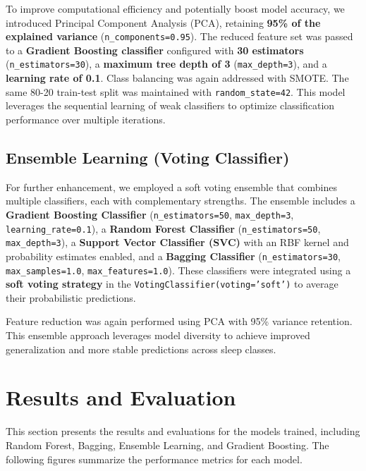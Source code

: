 To improve computational efficiency and potentially boost model accuracy, we introduced Principal Component Analysis (PCA), retaining \textbf{95\% of the explained variance} (\texttt{n\_components=0.95}). The reduced feature set was passed to a \textbf{Gradient Boosting classifier} configured with \textbf{30 estimators} (\texttt{n\_estimators=30}), a \textbf{maximum tree depth of 3} (\texttt{max\_depth=3}), and a \textbf{learning rate of 0.1}. Class balancing was again addressed with SMOTE. The same 80-20 train-test split was maintained with \texttt{random\_state=42}. This model leverages the sequential learning of weak classifiers to optimize classification performance over multiple iterations.

\subsection{Ensemble Learning (Voting Classifier)}

\begin{sloppypar}
	For further enhancement, we employed a soft voting ensemble that combines multiple classifiers, each with complementary strengths. The ensemble includes a \textbf{Gradient Boosting Classifier} (\texttt{n\_estimators=50}, \texttt{max\_depth=3}, \texttt{learning\_rate=0.1}), a \textbf{Random Forest Classifier} (\texttt{n\_estimators=50}, \texttt{max\_depth=3}), a \textbf{Support Vector Classifier (SVC)} with an RBF kernel and probability estimates enabled, and a \textbf{Bagging Classifier} (\texttt{n\_estimators=30}, \texttt{max\_samples=1.0}, \texttt{max\_features=1.0}). These classifiers were integrated using a \textbf{soft voting strategy} in the \texttt{VotingClassifier(voting='soft')} to average their probabilistic predictions.
	
	Feature reduction was again performed using PCA with 95\% variance retention. This ensemble approach leverages model diversity to achieve improved generalization and more stable predictions across sleep classes.
\end{sloppypar}


\section{Results and Evaluation}

This section presents the results and evaluations for the models trained, including Random Forest, Bagging, Ensemble Learning, and Gradient Boosting. The following figures summarize the performance metrics for each model.

